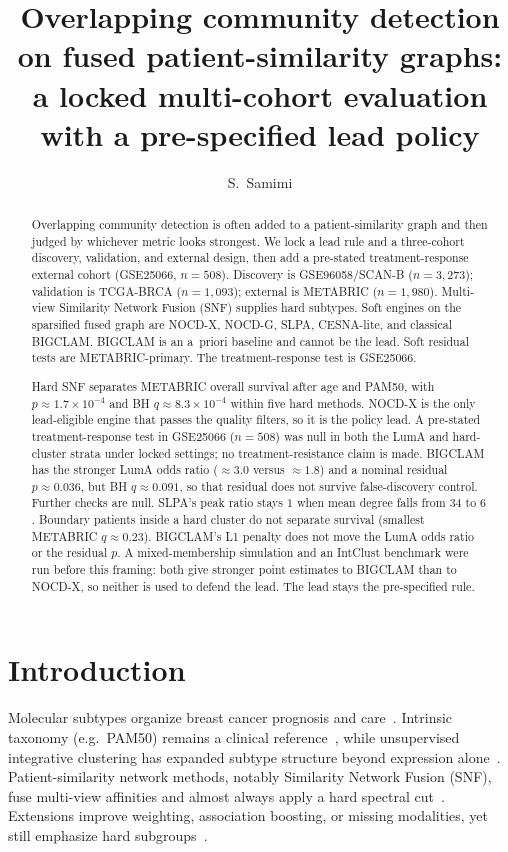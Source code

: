 \documentclass[11pt,a4paper]{article}
\title{Overlapping community detection on fused patient-similarity graphs:\\
a locked multi-cohort evaluation with a pre-specified lead policy}
\author[1,*]{S.~Samimi}
\affil[1]{Department of Electrical and Computer Engineering, K.N.~Toosi University of Technology, Tehran, Iran}
\affil[*]{Corresponding author: \href{mailto:saeedsamimi995@gmail.com}{saeedsamimi995@gmail.com}}
\begin{document}
\maketitle

\begin{abstract}
Overlapping community detection is often added to a patient-similarity graph and then judged by whichever metric looks strongest. We lock a lead rule and a three-cohort discovery, validation, and external design, then add a pre-stated treatment-response external cohort (GSE25066, $n=508$). Discovery is GSE96058/SCAN-B ($n=3{,}273$); validation is TCGA-BRCA ($n=1{,}093$); external is METABRIC ($n=1{,}980$). Multi-view Similarity Network Fusion (SNF) supplies hard subtypes. Soft engines on the sparsified fused graph are NOCD-X, NOCD-G, SLPA, CESNA-lite, and classical BIGCLAM. BIGCLAM is an a~priori baseline and cannot be the lead. Soft residual tests are METABRIC-primary. The treatment-response test is GSE25066.

Hard SNF separates METABRIC overall survival after age and PAM50, with $p \approx 1.7\times10^{-4}$ and BH $q \approx 8.3\times10^{-4}$ within five hard methods. NOCD-X is the only lead-eligible engine that passes the quality filters, so it is the policy lead. A pre-stated treatment-response test in GSE25066 ($n=508$) was null in both the LumA and hard-cluster strata under locked settings; no treatment-resistance claim is made. BIGCLAM has the stronger LumA odds ratio ($\approx 3.0$ versus $\approx 1.8$) and a nominal residual $p \approx 0.036$, but BH $q \approx 0.091$, so that residual does not survive false-discovery control. Further checks are null. SLPA's peak ratio stays $1$ when mean degree falls from $34$ to $6$. Boundary patients inside a hard cluster do not separate survival (smallest METABRIC $q \approx 0.23$). BIGCLAM's L1 penalty does not move the LumA odds ratio or the residual $p$. A mixed-membership simulation and an IntClust benchmark were run before this framing: both give stronger point estimates to BIGCLAM than to NOCD-X, so neither is used to defend the lead. The lead stays the pre-specified rule.
\end{abstract}

\section{Introduction}

Molecular subtypes organize breast cancer prognosis and care~\cite{ref_perou,ref_sorlie,ref_pam50,ref_metabric}. Intrinsic taxonomy (e.g.\ PAM50) remains a clinical reference~\cite{ref_pam50}, while unsupervised integrative clustering has expanded subtype structure beyond expression alone~\cite{ref_metabric,ref_tcga,ref_intclust}. Patient-similarity network methods, notably Similarity Network Fusion (SNF), fuse multi-view affinities and almost always apply a hard spectral cut~\cite{ref_snf,ref_cancer_subtypes}. Extensions improve weighting, association boosting, or missing modalities, yet still emphasize hard subgroups~\cite{ref_absnf,ref_wsnf,ref_misssnf,ref_nemo}.
\end{document}
